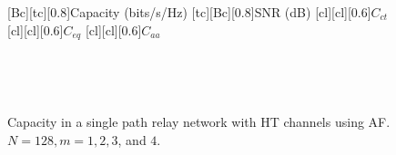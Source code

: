 \begin{figure}
    [Bc][tc][0.8]{Capacity (bits/s/Hz)}
    [tc][Bc][0.8]{SNR (dB)}
    [cl][cl][0.6]{$C_{ct}$}
    [cl][cl][0.6]{$C_{eq}$}
    [cl][cl][0.6]{$C_{aa}$}
\centerline{
	 \\
}
\centerline{
	 \\
}
\caption{Capacity in a single path relay network with HT channels using AF.  $N = 128, m = 1, 2, 3$, and $4$.}
\label{fig:sp_af_cap_plots_HT}
\end{figure}


